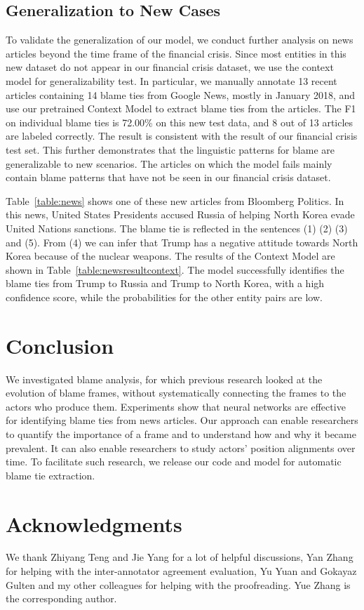 \documentclass[letterpaper]{article} %
\begin{document}
\subsection{Generalization to New Cases}

To validate the generalization of our model, we conduct further analysis on news articles beyond the time frame of the financial crisis. Since most entities in this new dataset do not appear in our financial crisis dataset, we use the context model for generalizability test. In particular, we manually annotate 13 recent articles containing 14 blame ties from Google News, mostly in January 2018, and use our pretrained Context Model to extract blame ties from the articles. The F1 on individual blame ties is 72.00\% on this new test data, and 8 out of 13 articles are labeled correctly. The result is consistent with the result of our financial crisis test set. This further demonstrates that the linguistic patterns for blame are generalizable to new scenarios. The articles on which the model fails mainly contain blame patterns that have not be seen in our financial crisis dataset.

Table~\ref{table:news} shows one of these new articles from Bloomberg Politics. In this news, United States Presidents accused Russia of helping North Korea evade United Nations sanctions. The blame tie is reflected in the sentences (1) (2) (3) and (5). From (4) we can infer that Trump has a negative attitude towards North Korea because of the nuclear weapons. The results of the Context Model are shown in Table~\ref{table:newsresultcontext}. The model successfully identifies the blame ties from Trump to Russia and Trump to North Korea, with a high confidence score, while the probabilities for the other entity pairs are low.

\section{Conclusion}

We investigated blame analysis, for which previous research looked at the evolution of blame frames, without systematically connecting the frames to the actors who produce them. Experiments show that neural networks are effective for identifying blame ties from news articles.  Our approach can enable researchers to quantify the importance of a frame and to understand how and why it became prevalent. It can also enable researchers to study actors' position alignments over time. To facilitate such research, we release our code and model for automatic blame tie extraction.

\section{Acknowledgments}
We thank Zhiyang Teng and Jie Yang for a lot of helpful discussions, Yan Zhang for helping with the inter-annotator agreement evaluation, Yu Yuan and Gokayaz Gulten and my other colleagues for helping with the proofreading. Yue Zhang is the corresponding author.




\end{document}
